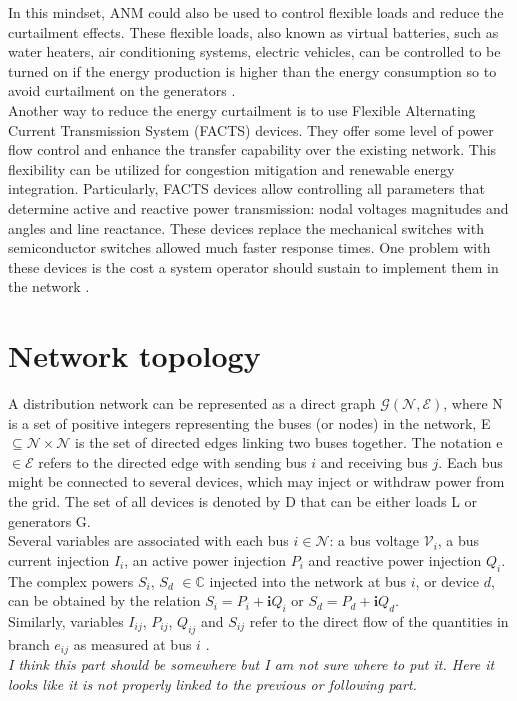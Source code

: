 In this mindset, \gls{ANM} could also be used to control flexible loads and reduce the curtailment effects. These flexible loads, also known as virtual batteries, such as water heaters, air conditioning systems, electric vehicles, can be controlled to be turned on if the energy production is higher than the energy consumption so to avoid curtailment on the generators \cite{flexibleloads}. \\
Another way to reduce the energy curtailment is to use Flexible Alternating Current Transmission System (\gls{FACTS}) devices. They offer some
level of power flow control and enhance the transfer capability over the existing network. This flexibility can be utilized for congestion
mitigation and renewable energy integration. Particularly, \gls{FACTS} devices allow controlling all parameters that determine active and reactive power transmission: nodal voltages magnitudes and angles and line reactance. These devices replace the mechanical switches with semiconductor switches allowed much faster response times. One problem with these devices is the cost a system operator should sustain to implement them in the network \cite{facts}.


\section{Network topology}
\label{sec:nt}
A distribution network can be represented as a direct graph $\mathcal{G}(\mathcal{N},\mathcal{E})$, where \gls{N} is a set of positive integers representing the buses (or nodes) in the network, \gls{E} $\subseteq \mathcal{N} \times \mathcal{N}$ is the set of directed edges linking two buses together. The notation \gls{e} $\in \mathcal{E}$ refers to the directed edge with sending bus $i$ and receiving bus $j$. Each bus might be connected to several devices, which may inject or withdraw power from the grid. The set of all devices is denoted by \gls{D} that can be either loads \gls{L} or generators \gls{G}. \\
Several variables are associated with each bus $i \in \mathcal{N}$: a bus voltage $\mathcal{V}_i$, a bus current injection $I_i$, an active power injection $P_i$ and reactive power injection $Q_i$. The complex powers $S_i$, $S_d$ $\in \mathbb{C}$ injected into the network at bus $i$, or device $d$, can be obtained by the relation $S_i = P_i + \mathbf{i}Q_i$ or $S_d = P_d + \mathbf{i}Q_d$. \\
Similarly, variables $I_{ij}$, $P_{ij}$, $Q_{ij}$ and $S_{ij}$ refer to the direct flow of the quantities in branch $e_{ij}$ as measured at bus $i$ \cite{gym-anm}.\\
\emph{I think this part should be somewhere but I am not sure where to put it. Here it looks like it is not properly linked to the previous or following part.}


